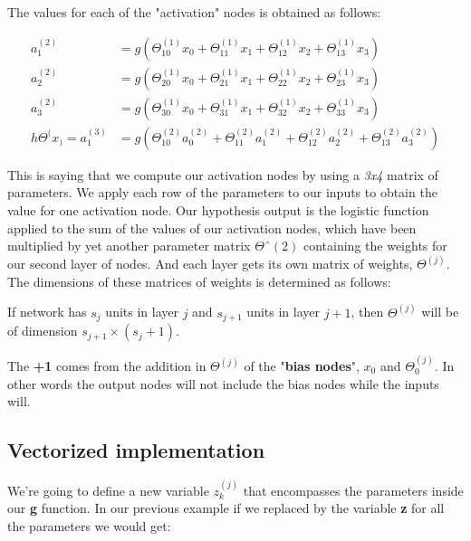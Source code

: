 The values for each of the "activation" nodes is obtained as follows:

\begin{align*}
a^{(2)}_1&=g\left(\Theta^{(1)}_{10}x_0+\Theta^{(1)}_{11}x_1+\Theta^{(1)}_{12}x_2+\Theta^{(1)}_{13}x_3\right)\\
a^{(2)}_2&=g\left(\Theta^{(1)}_{20}x_0+\Theta^{(1)}_{21}x_1+\Theta^{(1)}_{22}x_2+\Theta^{(1)}_{23}x_3\right)\\
a^{(2)}_3&=g\left(\Theta^{(1)}_{30}x_0+\Theta^{(1)}_{31}x_1+\Theta^{(1)}_{32}x_2+\Theta^{(1)}_{33}x_3\right)\\
h\Theta^(x_)=a^{(3)} _1&=g\left(\Theta^{(2)}_{10}a^{(2)}_0+\Theta^{(2)}_{11}a^{(2)}_1+\Theta^{(2)}_{12}a^{(2)}_2+\Theta^{(2)}_{13}a^{(2)}_3\right)
\end{align*}

This is saying that we compute our activation nodes by using a \textit{3x4} matrix of parameters. We apply each row of the parameters to our inputs to obtain the value for one activation node. Our hypothesis output is the logistic function applied to the sum of the values of our activation nodes, which have been multiplied by yet another parameter matrix $ \Theta ˆ{(2)} $ containing the weights for our second layer of nodes. And each layer gets its own matrix of weights, $ \Theta ^{(j)} $.\\

The dimensions of these matrices of weights is determined as follows:\\

\begin{tcolorbox}[width=\textwidth,colback={white},colbacktitle=white]
If network has $ s_j $ units in layer $ j $ and $ s_{j+1} $  units in layer $ j+1 $, then $ \Theta^{(j)} $ will be of dimension $ s_{j+1} \times (s_j+1) $.
\end{tcolorbox}

\vspace{0.5cm}

The \textbf{+1} comes from the addition in $ \Theta ^{(j)} $ of the "\textbf{bias nodes}", $ x_0 $ and $ \Theta ^{(j)}_0 $. In other words the output nodes will not include the bias nodes while the inputs will.

\subsection{Vectorized implementation}

We're going to define a new variable $ z_k^{(j)} $ that encompasses the parameters inside our \textbf{g} function. In our previous example if we replaced by the variable \textbf{z} for all the parameters we would get:

